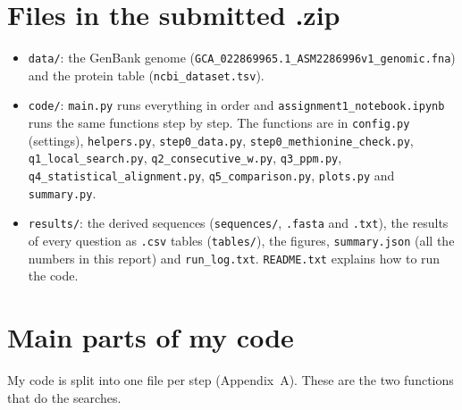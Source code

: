 \documentclass[11pt,a4paper]{article}
\begin{document}
\section{Files in the submitted .zip}
{\footnotesize\raggedright
\begin{itemize}[itemsep=0pt,topsep=2pt]
  \item \texttt{data/}: the GenBank genome
        (\texttt{GCA\_022869965.1\_}\allowbreak\texttt{ASM2286996v1\_genomic.fna}) and the protein
        table (\texttt{ncbi\_dataset.tsv}).
  \item \texttt{code/}: \texttt{main.py} runs everything in order and \texttt{assignment1\_notebook.ipynb}
        runs the same functions step by step. The functions are in \texttt{config.py} (settings),
        \texttt{helpers.py}, \texttt{step0\_data.py}, \texttt{step0\_methionine\_check.py},
        \texttt{q1\_local\_search.py}, \texttt{q2\_consecutive\_w.py}, \texttt{q3\_ppm.py},
        \texttt{q4\_statistical\_}\allowbreak\texttt{alignment.py}, \texttt{q5\_comparison.py},
        \texttt{plots.py} and \texttt{summary.py}.
  \item \texttt{results/}: the derived sequences (\texttt{sequences/}, \texttt{.fasta} and
        \texttt{.txt}), the results of every question as \texttt{.csv} tables (\texttt{tables/}), the
        figures, \texttt{summary.json} (all the numbers in this report) and \texttt{run\_log.txt}.
        \texttt{README.txt} explains how to run the code.
\end{itemize}
}

\clearpage
\section{Main parts of my code}
My code is split into one file per step (Appendix~A). These
are the two functions that do the searches.
\end{document}
